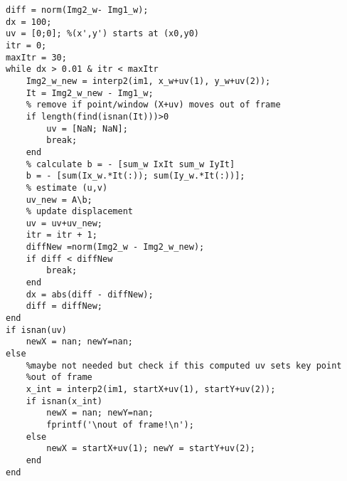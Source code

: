 \begin{verbatim}
diff = norm(Img2_w- Img1_w);
dx = 100;
uv = [0;0]; %(x',y') starts at (x0,y0) 
itr = 0;
maxItr = 30;
while dx > 0.01 & itr < maxItr
    Img2_w_new = interp2(im1, x_w+uv(1), y_w+uv(2));
    It = Img2_w_new - Img1_w;    
    % remove if point/window (X+uv) moves out of frame
    if length(find(isnan(It)))>0
        uv = [NaN; NaN];
        break;
    end
    % calculate b = - [sum_w IxIt sum_w IyIt]
    b = - [sum(Ix_w.*It(:)); sum(Iy_w.*It(:))];
    % estimate (u,v)
    uv_new = A\b;
    % update displacement
    uv = uv+uv_new;
    itr = itr + 1;
    diffNew =norm(Img2_w - Img2_w_new);
    if diff < diffNew
        break;
    end
    dx = abs(diff - diffNew);
    diff = diffNew;
end
if isnan(uv)
    newX = nan; newY=nan;
else 
    %maybe not needed but check if this computed uv sets key point
    %out of frame
    x_int = interp2(im1, startX+uv(1), startY+uv(2));
    if isnan(x_int)
        newX = nan; newY=nan;
        fprintf('\nout of frame!\n');
    else
        newX = startX+uv(1); newY = startY+uv(2);
    end
end
\end{verbatim}


